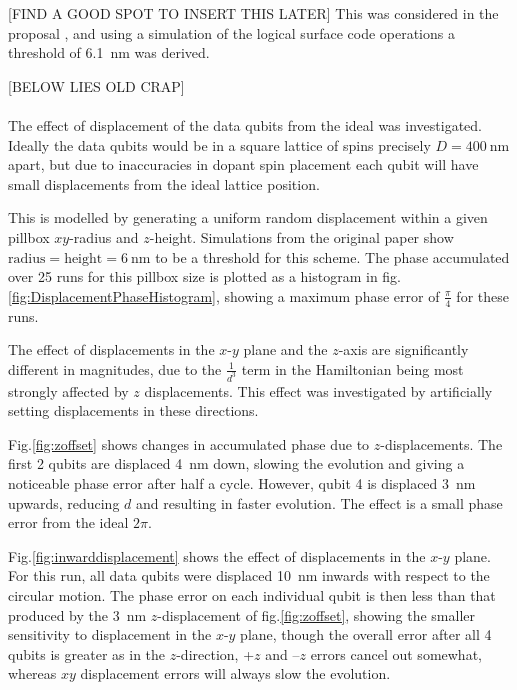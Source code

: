 [FIND A GOOD SPOT TO INSERT THIS LATER] This was considered in the proposal \cite{OGorman2016}, and using a simulation of the logical surface code operations a threshold of \SI{6.1}{\nano\metre} was derived.

[BELOW LIES OLD CRAP]\\
\\ 

The effect of displacement of the data qubits from the ideal was investigated. Ideally the data qubits would be in a square lattice of spins precisely $D = \SI{400}{\nano\metre}$ apart, but due to inaccuracies in dopant spin placement each qubit will have small displacements from the ideal lattice position.

This is modelled by generating a uniform random displacement within a given pillbox $xy$-radius and $z$-height. Simulations from the original paper show $\textrm{radius} = \textrm{height} = \SI{6}{\nano\metre}$ to be a threshold for this scheme. The phase accumulated over 25 runs for this pillbox size is plotted as a histogram in fig.\@ \ref{fig:DisplacementPhaseHistogram}, showing a maximum phase error of $\tfrac{\pi}{4}$ for these runs. 



The effect of displacements in the $x$-$y$ plane and the $z$-axis are significantly different in magnitudes, due to the $\tfrac{1}{d^3}$ term in the Hamiltonian being most strongly affected by $z$ displacements. This effect was investigated by artificially setting displacements in these directions.

Fig.\@ \ref{fig:zoffset} shows changes in accumulated phase due to $z$-displacements. The first 2 qubits are displaced \SI{4}{\nano\metre} down, slowing the evolution and giving a noticeable phase error after half a cycle. However, qubit 4 is displaced \SI{3}{\nano\metre} upwards, reducing $d$ and resulting in faster evolution. The effect is a small phase error from the ideal $2\pi$.

Fig.\@ \ref{fig:inwarddisplacement} shows the effect of displacements in the $x$-$y$ plane. For this run, all data qubits were displaced \SI{10}{\nano\metre} inwards with respect to the circular motion. The phase error on each individual qubit is then less than that produced by the \SI{3}{\nano\metre} $z$-displacement of fig.\@ \ref{fig:zoffset}, showing the smaller sensitivity to displacement in the $x$-$y$ plane, though the overall error after all 4 qubits is greater as in the $z$-direction, +$z$ and --$z$ errors cancel out somewhat, whereas $xy$ displacement errors will always slow the evolution.



